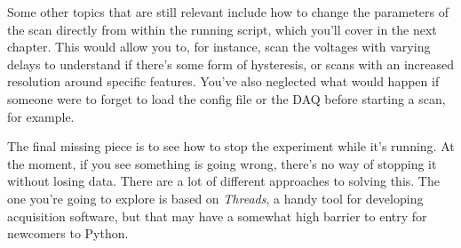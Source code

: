 Some other topics that are still relevant include how to change the parameters of the scan directly from within the running script, which you'll cover in the next chapter. This would allow you to, for instance, scan the voltages with varying delays to understand if there's some form of hysteresis, or scans with an increased resolution around specific features. You've also neglected what would happen if someone were to forget to load the config file or the DAQ before starting a scan, for example.

The final missing piece is to see how to stop the experiment while it's running. At the moment, if you see something is going wrong, there's no way of stopping it without losing data. There are a lot of different approaches to solving this. The one you're going to explore is based on \emph{Threads}, a handy tool for developing acquisition software, but that may have a somewhat high barrier to entry for newcomers to Python.
